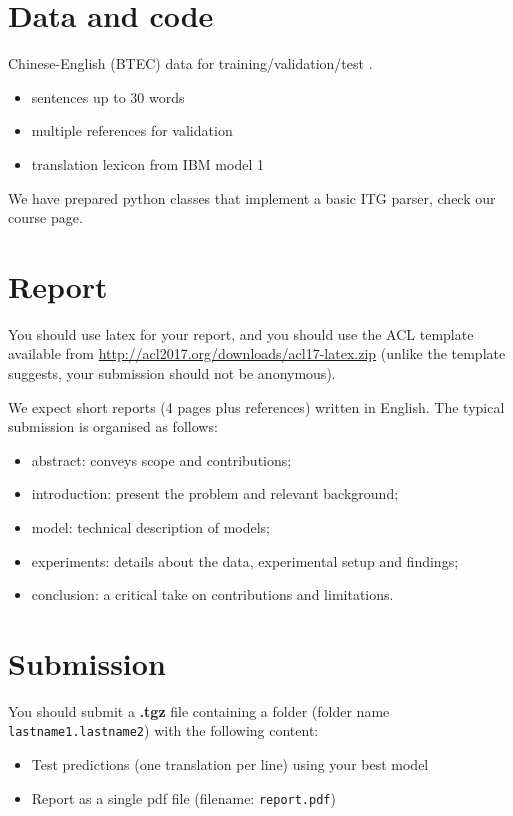 \section{Data and code}

Chinese-English (BTEC) data for training/validation/test \citep{Takezawa+2002:BTEC}.
\begin{itemize}
	\item sentences up to 30 words
	\item multiple references for validation
	\item translation lexicon from IBM model 1
\end{itemize}

We have prepared python classes that implement a basic ITG parser, check our course page.


\section{Report}

You should use latex for your report, and you should use the ACL template available from \url{http://acl2017.org/downloads/acl17-latex.zip} (unlike the template suggests, your submission should not be anonymous). 

We expect short reports (4 pages plus references) written in English. The typical submission is organised as follows: 
\begin{itemize}
	\item abstract: conveys scope and contributions;
	\item introduction: present the problem and relevant background;
	\item model: technical description of models;
	\item experiments: details about the data, experimental setup and findings;
	\item conclusion: a critical take on contributions and limitations.
\end{itemize}


\section{Submission}

You should submit a \textbf{.tgz} file containing a folder (folder name {\tt lastname1.lastname2}) with the following content: 
\begin{itemize}
	\item Test predictions (one translation per line) using your best model
	\item Report as a single pdf file (filename: {\tt report.pdf})
\end{itemize}


